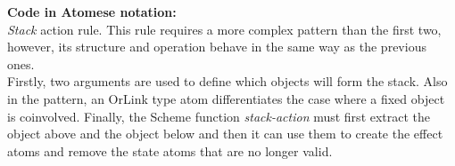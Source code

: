 \bigskip

\begin{footnotesize}
\textbf{Code in Atomese notation:} \\
\textit{Stack} action rule. This rule requires a more complex pattern than the first two, however, its structure and operation behave in the same way as the previous ones. \\
Firstly, two arguments are used to define which objects will form the stack.
Also in the pattern, an OrLink type atom differentiates the case where a fixed object is coinvolved. 
Finally, the Scheme function \textit{stack-action} must first extract the object above and the object below and then it can use them to create the effect atoms and remove the state atoms that are no longer valid.
\end{footnotesize}

